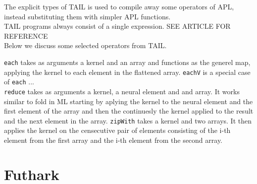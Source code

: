 \documentclass[11pt]{article}
\begin{document}
The explicit types of TAIL is used to compile away some operators of APL, instead substituting them with simpler APL functions. \\

TAIL programs always consist of a single expression. SEE ARTICLE FOR REFERENCE \\

Below we discuss some selected operators from TAIL.

{\tt each} takes as arguments a kernel and an array and functions as the generel map, applying the kernel to each element in the flattened array. 
{\tt eachV} is a special case of {\tt each} ...\\
{\tt reduce} takes as arguments a kernel, a neural element and and array. It works similar to fold in ML starting by aplying the kernel to the neural element and the first element of the array and then the continuesly the kernel applied to the result and the next element in the array. 
{\tt zipWith} takes a kernel and two arrays. It then applies the kernel on the censecutive pair of elements consisting of the i-th element from the first array and the i-th element from the second array. 




 


\section{Futhark}
\end{document}
